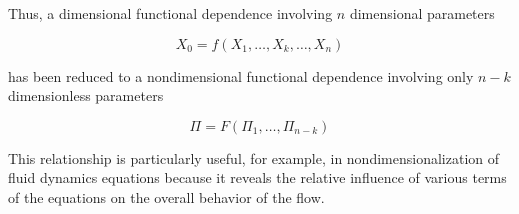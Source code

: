 \documentclass[
12pt, %
a4paper, %
oneside, %
headinclude,footinclude, %
BCOR5mm, %
]{scrartcl}
\begin{document}
Thus, a dimensional functional dependence involving $n$ dimensional parameters

$$X_0 = f(X_1, \hdots, X_k, \hdots, X_n)$$

has been reduced to a nondimensional functional dependence involving only $n-k$ dimensionless parameters

$$ \Pi = F(\Pi_1, \hdots, \Pi_{n-k}) $$

This relationship is particularly useful, for example, in nondimensionalization of fluid dynamics equations because it reveals the relative influence of various terms of the equations on the overall behavior of the flow.





\end{document}
